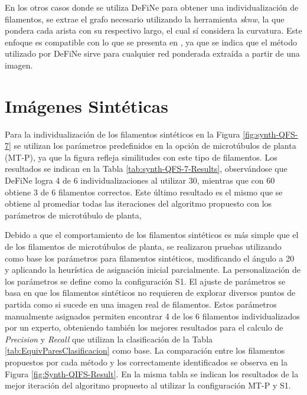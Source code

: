 En los otros casos donde se utiliza DeFiNe para obtener una individualizaci\'on de filamentos, se extrae el grafo necesario utilizando la herramienta {\it sknw}, la que pondera cada arista con su respectivo largo, el cual s\'i considera la curvatura. Este enfoque es compatible con lo que se presenta en \citet{breuer2015define}, ya que se indica que el m\'etodo utilizado por DeFiNe sirve para cualquier red ponderada extra\'ida a partir de una imagen.


\section{Im\'agenes Sint\'eticas}

Para la individualizaci\'on de los filamentos sint\'eticos en la Figura \ref{fig:synth-QFS-7} se utilizan los par\'ametros predefinidos en la opci\'on de microt\'ubulos de planta (MT-P), ya que la figura refleja similitudes con este tipo de filamentos.
Los resultados se indican en la Tabla \ref{tab:synth-QFS-7-Results}, observ\'andose que DeFiNe logra 4 de 6 individualizaciones al utilizar 30\textdegree, mientras que con 60\textdegree~ obtiene 3 de 6 filamentos correctos. Este \'ultimo resultado es el mismo que se obtiene al promediar todas las iteraciones del algoritmo propuesto con los par\'ametros de microt\'ubulo de planta,

Debido a que el comportamiento de los filamentos sint\'eticos es m\'as simple que el de los filamentos de microt\'ubulos de planta, se realizaron pruebas utilizando como base los par\'ametros para filamentos sint\'eticos, modificando el \'angulo a 20\textdegree~ y aplicando la heur\'istica de asignaci\'on inicial parcialmente. La personalizaci\'on de los par\'ametros se define como la configuraci\'on S1. El ajuste de par\'ametros se basa en que los filamentos sint\'eticos no requieren de explorar diversos puntos de partida como si sucede en una imagen real de filamentos. Estos par\'ametros manualmente asignados permiten encontrar 4 de los 6 filamentos individualizados por un experto, obteniendo tambi\'en los mejores resultados para el calculo de {\it Precision} y {\it Recall} que utilizan la clasificaci\'on de la Tabla \ref{tab:EquivParesClasificacion} como base. La comparaci\'on entre los filamentos propuestos por cada m\'etodo y los correctamente identificados se observa en la Figura \ref{fig:Synth-QIFS-Result}. En la misma tabla se indican los resultados de la mejor iteraci\'on del algoritmo propuesto al utilizar la configuraci\'on MT-P y S1.



